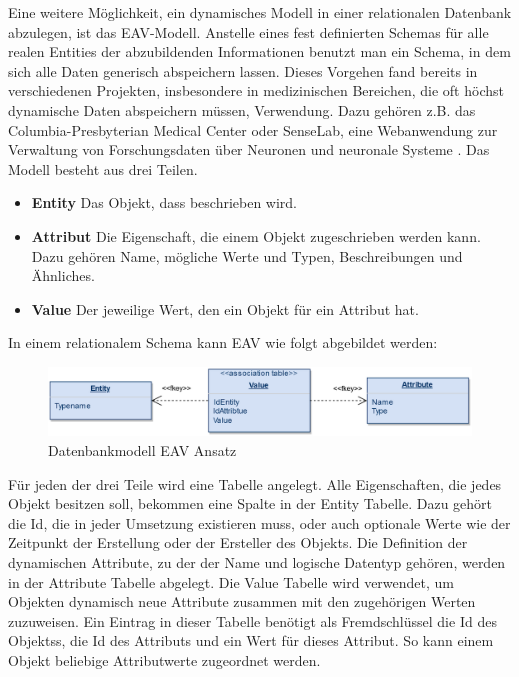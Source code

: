 Eine weitere Möglichkeit, ein dynamisches Modell in einer relationalen Datenbank abzulegen, ist das \ac{EAV}-Modell. Anstelle eines fest definierten Schemas für alle realen Entities der abzubildenden Informationen benutzt man ein Schema, in dem sich alle Daten generisch abspeichern lassen. Dieses Vorgehen fand bereits in verschiedenen Projekten, insbesondere in medizinischen Bereichen, die oft höchst dynamische Daten abspeichern müssen, Verwendung. Dazu gehören z.B. das Columbia-Presbyterian Medical Center\cite{Johnson.1990} oder SenseLab, eine Webanwendung zur Verwaltung von Forschungsdaten über Neuronen und neuronale Systeme \cite{McDougal.2017, Marenco.1999}.
Das Modell besteht aus drei Teilen.

\begin{itemize}
\item \textbf{Entity}
Das Objekt, dass beschrieben wird.
\item \textbf{Attribut}
Die Eigenschaft, die einem Objekt zugeschrieben werden kann. Dazu gehören Name, mögliche Werte und Typen, Beschreibungen und Ähnliches.
\item \textbf{Value}
Der jeweilige Wert, den ein Objekt für ein Attribut hat.
\end{itemize}

In einem relationalem Schema kann EAV wie folgt abgebildet werden:


\begin{figure}[h]
\centering
\includegraphics[scale=1.1]{bilder/eavModel.png}
\caption{Datenbankmodell EAV Ansatz}
\end{figure}

Für jeden der drei Teile wird eine Tabelle angelegt. Alle Eigenschaften, die jedes Objekt besitzen soll, bekommen eine Spalte in der Entity Tabelle. Dazu gehört die Id, die in jeder Umsetzung existieren muss, oder auch optionale Werte wie der Zeitpunkt der Erstellung oder der Ersteller des Objekts. Die Definition der dynamischen Attribute, zu der der Name und logische Datentyp gehören, werden in der Attribute Tabelle abgelegt. Die Value Tabelle wird verwendet, um Objekten dynamisch neue Attribute zusammen mit den zugehörigen Werten zuzuweisen. Ein Eintrag in dieser Tabelle benötigt als Fremdschlüssel die Id des Objektss, die Id des Attributs und ein Wert für dieses Attribut. So kann einem Objekt beliebige Attributwerte zugeordnet werden.

